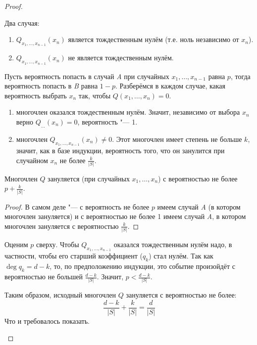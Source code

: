 \begin{proof}
\begin{description}
				Два случая:
				\begin{enumerate}[label=\emph{\Alph*}.]
					\item $Q_{x_1, \dots, x_{n-1}}(x_n)$ является тождественным нулём (т.е. ноль независимо от $x_n$).
					\item $Q_{x_1, \dots, x_{n-1}}(x_n)$ не является тождественным нулём.
				\end{enumerate}
				Пусть вероятность попасть в случай \emph{A} при случайных $x_1, \dots, x_{n-1}$ равна $p$, тогда вероятность попасть в \emph{B} равна $1-p$.
				Разберёмся в каждом случае, какая вероятность выбрать $x_n$ так, чтобы $Q(x_1, \dots, x_n)=0$.
				\begin{enumerate}[label=\emph{\Alph*}.]
					\item
						многочлен оказался тождественным нулём.
						Значит, независимо от выбора $x_n$ верно $Q_{\dots}(x_n)=0$, вероятность "--- 1.
					\item
						многочлен $Q_{x_1, \dots, x_{n-1}}(x_n) \neq 0$.
						Этот многочлен имеет степень не больше $k$, значит, как в базе индукции, вероятность того, что он занулится
						при случайном $x_n$ не более $\frac{k}{|S|}$.
				\end{enumerate}
				\begin{assertion}
					Многочлен $Q$ зануляется (при случайных $x_1, \dots, x_n$) с вероятностью не более $p + \frac{k}{|S|}$.
				\end{assertion}
				\begin{proof}
					В самом деле "--- с вероятность не более $p$ имеем случай \emph{A} (в котором многочлен зануляется) и с вероятностью не более 1 имеем
					случай \emph{A}, в котором многочлен зануляется с вероятностью $\frac{k}{|S|}$.
				\end{proof}

				Оценим $p$ сверху.
				Чтобы $Q_{x_1, \dots, x_{n-1}}$ оказался тождественным нулём надо, в частности, чтобы его старший коэффициент ($q_k$) стал нулём.
				Так как $\deg q_k = d - k$, то, по предположению индукции, это событие произойдёт с вероятностью не большей $\frac{d-k}{|S|}$.
				Значит, $p < \frac{d-k}{|S|}$.

				Таким образом, исходный многочлен $Q$ зануляется с вероятностью не более:
				\[ \frac{d-k}{|S|} + \frac{k}{|S|} = \frac{d}{|S|} \]
				Что и требовалось показать.
		\end{description}
	\end{proof}


